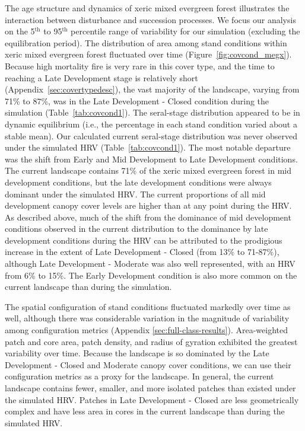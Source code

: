The age structure and dynamics of xeric mixed evergreen forest illustrates the interaction between disturbance and succession processes. We focus our analysis on the 5$^{\text{th}}$ to 95$^{\text{th}}$ percentile range of variability for our simulation (excluding the equilibration period). %
%
The distribution of area among stand conditions within xeric mixed evergreen forest fluctuated over time (Figure~\ref{fig:covcond_megx}). Because high mortality fire is very rare in this cover type, and the time to reaching a Late Development stage is relatively short (Appendix~\ref{sec:covertypedesc}), the vast majority of the landscape, varying from 71\% to 87\%, was in the Late Development - Closed condition during the simulation (Table~\ref{tab:covcond1}).  %
%
The seral-stage distribution appeared to be in dynamic equilibrium (i.e., the percentage in each stand condition varied about a stable mean). Our calculated current seral-stage distribution was never observed under the simulated HRV (Table~\ref{tab:covcond1}). The most notable departure was the shift from Early and Mid Development to Late Development conditions. The current landscape contains 71\% of the xeric mixed evergreen forest in mid development conditions, but the late development conditions were always dominant under the simulated HRV. The current proportions of all mid development canopy cover levels are higher than at any point during the HRV. As described above, much of the shift from the dominance of mid development conditions observed in the current distribution to the dominance by late development conditions during the HRV can be attributed to the prodigious increase in the extent of Late Development - Closed (from 13\% to 71-87\%), although Late Development - Moderate was also well represented, with an HRV from 6\% to 15\%. The Early Development condition is also more common on the current landscape than during the simulation.

The spatial configuration of stand conditions fluctuated markedly over time as well, although there was considerable variation in the magnitude of variability among configuration metrics (Appendix \ref{sec:full-class-results}). Area-weighted patch and core area, patch density, and radius of gyration exhibited the greatest variability over time. Because the landscape is so dominated by the Late Development - Closed and Moderate canopy cover conditions, we can use their configuration metrics as a proxy for the landscape. In general, the current landscape contains fewer, smaller, and more isolated patches than existed under the simulated HRV. Patches in Late Development - Closed are less geometrically complex and have less area in cores in the current landscape than during the simulated HRV.


